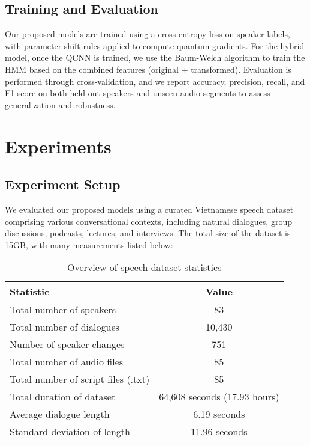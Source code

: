 \documentclass[conference]{IEEEtran}
\begin{document}
\subsection{Training and Evaluation}

Our proposed models are trained using a cross-entropy loss on speaker labels, with parameter-shift rules applied to compute quantum gradients. For the hybrid model, once the QCNN is trained, we use the Baum-Welch algorithm to train the HMM based on the combined features (original + transformed). Evaluation is performed through cross-validation, and we report accuracy, precision, recall, and F1-score on both held-out speakers and unseen audio segments to assess generalization and robustness.


\section{Experiments}
\subsection{Experiment Setup}
We evaluated our proposed models using a curated Vietnamese speech dataset comprising various conversational contexts, including natural dialogues, group discussions, podcasts, lectures, and interviews.
The total size of the dataset is 15GB, with many measurements listed below:
\begin{table}[h]
    \centering
    \caption{Overview of speech dataset statistics}
    \begin{tabular}{|l|c|}
        \hline
        \textbf{Statistic}                  & \textbf{Value}               \\
        \hline
        Total number of speakers            & 83                           \\
        Total number of dialogues           & 10,430                       \\
        Number of speaker changes           & 751                          \\
        Total number of audio files         & 85                           \\
        Total number of script files (.txt) & 85                           \\
        Total duration of dataset           & 64,608 seconds (17.93 hours) \\
        Average dialogue length             & 6.19 seconds                 \\
        Standard deviation of length        & 11.96 seconds                \\
        \hline
    \end{tabular}
\end{table}
\end{document}
